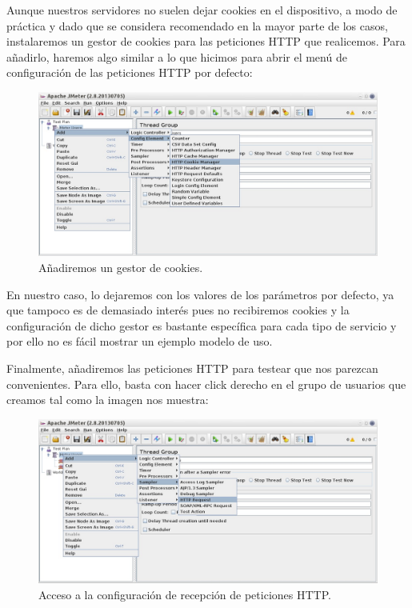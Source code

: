 \documentclass[paper=a4, fontsize=11pt]{scrartcl} %
\numberwithin{equation}{section} %
\numberwithin{figure}{section} %
\numberwithin{table}{section} %
\begin{document}
\begin{enumerate}
		Aunque nuestros servidores no suelen dejar cookies en el dispositivo, a modo de práctica y dado
		que se considera recomendado en la mayor parte de los casos, instalaremos un gestor de cookies
		para las peticiones HTTP que realicemos. Para añadirlo, haremos algo similar a lo que hicimos
		para abrir el menú de configuración de las peticiones HTTP por defecto:
		
		\begin{figure}[H]
			\centering
			\includegraphics[width=15cm]{Ejercicio_7e.jpg}
			\caption{Añadiremos un gestor de cookies.}
			\label{fig:cookie}
		\end{figure}
		
		En nuestro caso, lo dejaremos con los valores de los parámetros por defecto, ya que tampoco es
		de demasiado interés pues no recibiremos cookies y la configuración de dicho gestor es bastante
		específica para cada tipo de servicio y por ello no es fácil mostrar un ejemplo modelo de uso.
		
		Finalmente, añadiremos las peticiones HTTP para testear que nos parezcan convenientes. Para
		ello, basta con hacer click derecho en el grupo de usuarios que creamos tal como la imagen nos
		muestra:
		
		\begin{figure}[H]
			\centering
			\includegraphics[width=15cm]{Ejercicio_7f.jpg}
			\caption{Acceso a la configuración de recepción de peticiones HTTP.}
			\label{fig:http_sampler}
		\end{figure}
		

\end{enumerate}
\end{document}
